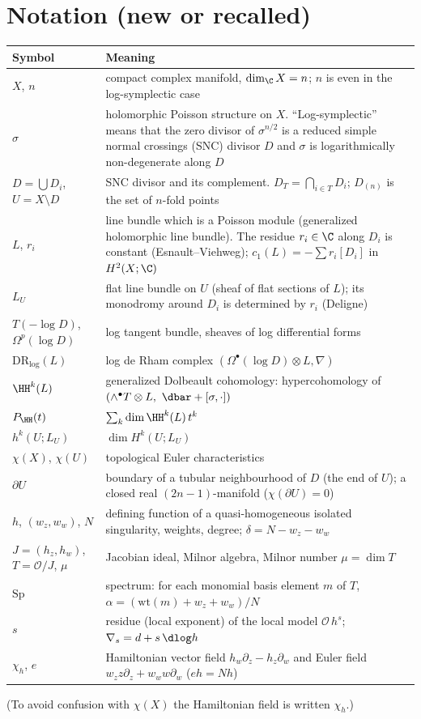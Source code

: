 \section{Notation (new or recalled)}\label{sec:notation}
\begin{longtable}{>{\raggedright\arraybackslash}p{3.8cm}>{\raggedright\arraybackslash}p{11.2cm}}
\toprule Symbol & Meaning\\ \midrule\endhead
$X$, $n$ & compact complex manifold, $\dim_\C X=n$; $n$ is even in the log-symplectic case\\
$\sigma$ & holomorphic Poisson structure on $X$. ``Log-symplectic'' means that the zero divisor of $\sigma^{n/2}$ is a reduced simple normal crossings (SNC) divisor $D$ and $\sigma$ is logarithmically non-degenerate along $D$\\
$D=\bigcup D_i$, $U=X\setminus D$ & SNC divisor and its complement. $D_T=\bigcap_{i\in T}D_i$; $D_{(n)}$ is the set of $n$-fold points\\
$L$, $r_i$ & line bundle which is a Poisson module (generalized holomorphic line bundle). The residue $r_i\in\C$ along $D_i$ is constant (Esnault--Viehweg); $c_1(L)=-\sum r_i[D_i]$ in $H^2(X;\C)$\\
$L_U$ & flat line bundle on $U$ (sheaf of flat sections of $L$); its monodromy around $D_i$ is determined by $r_i$ (Deligne)\\
$T(-\log D)$, $\Omega^p(\log D)$ & log tangent bundle, sheaves of log differential forms\\
$\mathrm{DR}_{\log}(L)$ & log de Rham complex $(\Omega^\bullet(\log D)\otimes L,\nabla)$\\
$\HH^k(L)$ & generalized Dolbeault cohomology: hypercohomology of $(\wedge^\bullet T\otimes L,\ \dbar+[\sigma,\cdot])$\\
$P_{\HH}(t)$ & $\sum_k\dim\HH^k(L)\,t^k$\\
$h^k(U;L_U)$ & $\dim H^k(U;L_U)$\\
$\chi(X)$, $\chi(U)$ & topological Euler characteristics\\
$\partial U$ & boundary of a tubular neighbourhood of $D$ (the end of $U$); a closed real $(2n-1)$-manifold ($\chi(\partial U)=0$)\\
$h$, $(w_z,w_w)$, $N$ & defining function of a quasi-homogeneous isolated singularity, weights, degree; $\delta=N-w_z-w_w$\\
$J=(h_z,h_w)$, $T=\mathcal O/J$, $\mu$ & Jacobian ideal, Milnor algebra, Milnor number $\mu=\dim T$\\
$\mathrm{Sp}$ & spectrum: for each monomial basis element $m$ of $T$, $\alpha=(\mathrm{wt}(m)+w_z+w_w)/N$\\
$s$ & residue (local exponent) of the local model $\mathcal O\,h^s$; $\nabla_s=d+s\,\dlog h$\\
$\chi_h$, $e$ & Hamiltonian vector field $h_w\partial_z-h_z\partial_w$ and Euler field $w_zz\partial_z+w_ww\partial_w$ ($e h=Nh$)\\
\bottomrule
\end{longtable}
(To avoid confusion with $\chi(X)$ the Hamiltonian field is written $\chi_h$.)


